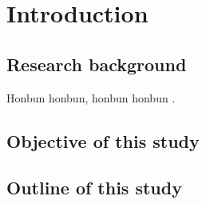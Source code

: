 \chapter{Introduction}

\section{Research background}

Honbun honbun, honbun honbun \citep{guo_deep_2019, zhao_crop_2019}. 


\section{Objective of this study}


\section{Outline of this study}